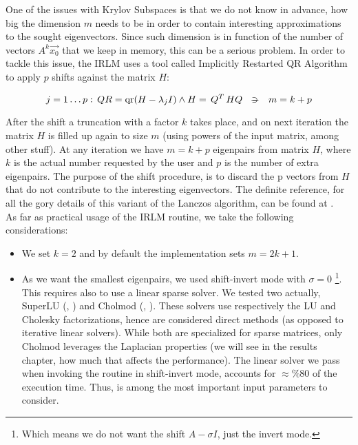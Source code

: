 One of the issues with Krylov Subspaces is that we do not know in
advance, how big the dimension $m$ needs to be in order to contain
interesting approximations to the sought eigenvectors. Since such
dimension is in function of the number of vectors $A^k \vec{x_0}$ that
we keep in memory, this can be a serious problem. In order to tackle
this issue, the \gls{IRLM} uses a tool called Implicitly Restarted QR
Algorithm to apply $p$ shifts against the matrix $H$:

\begin{equation*}
    j=1 \ldots p:\, QR = \func{qr}(H - \lambda_j I) \land H = \trans{Q}HQ
    \ds{\suchthat}
    m = k + p
\end{equation*}
\joinbelow{1cm}

After the shift a truncation with a factor $k$ takes place, and on
next iteration the matrix $H$ is filled up again to size $m$ (using
powers of the input matrix, among other stuff). 
At any iteration we have $m = k + p$ eigenpairs from matrix $H$, where
$k$ is the actual number requested by the user and $p$ is the number
of extra eigenpairs. The purpose of the shift procedure, is to 
discard the p vectors from $H$ that do not contribute to the
interesting eigenvectors. The definite reference, for all the gory
details of this variant of the Lanczos algorithm, can be found at
\cite{arpack}. \\

As far as practical usage of the \gls{IRLM} routine, we take the following
considerations:

\begin{itemize}
\item We set $k=2$ and by default the implementation sets $m=2k+1$.
\item As we want the smallest eigenpairs, we used shift-invert mode
  with $\sigma=0$ \footnote{Which means we 
  do not want the shift $A - \sigma I$, just the invert mode.}. This
  requires also to use a linear sparse solver. We tested two actually, \gls{SuperLU}
  (\cite{superlu97}, \cite{superlu05}) and  \gls{Cholmod} (\cite{cholmod08},
  \cite{cholmod08a}). These solvers use respectively the LU and
  Cholesky factorizations, hence are considered direct
  methods (as opposed to iterative linear solvers). While
  both are specialized for sparse matrices, only \gls{Cholmod} leverages
  the \gls{Laplacian} properties (we will see in the results chapter, how much
  that affects the performance). The linear solver we pass when invoking the
  routine in shift-invert mode, accounts for $\approx \%80$ of
  the execution time. Thus, is among the most important input parameters
  to consider. 
\end{itemize}

